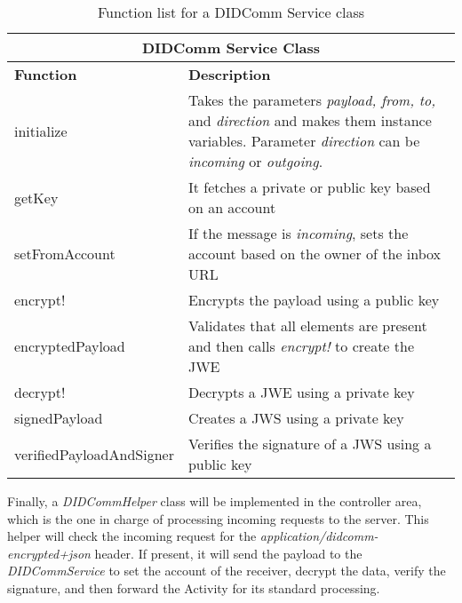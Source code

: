 \begin{table}[H]
  \centering
  \begin{tabular}{|p{5cm}|p{10cm}| }
    \hline
    \multicolumn{2}{|c|}{DIDComm Service Class} \\
    \hline
    \textbf{Function} & \textbf{Description} \\
    \hline
    \hline
    initialize & Takes the parameters \emph{payload, from, to,} and \emph{direction} and makes them instance variables. Parameter \emph{direction} can be \emph{incoming} or \emph{outgoing}. \\
    \hline
    getKey & It fetches a private or public key based on an account\\
    \hline
    setFromAccount & If the message is \emph{incoming}, sets the account based on the owner of the inbox URL\\
    \hline
    encrypt! & Encrypts the payload using a public key\\
    \hline
    encryptedPayload & Validates that all elements are present and then calls \emph{encrypt!} to create the JWE\\
    \hline
    decrypt! & Decrypts a JWE using a private key\\ 
    \hline
    signedPayload & Creates a JWS using a private key\\ 
    \hline
    verifiedPayloadAndSigner & Verifies the signature of a JWS using a public key\\
    \hline
  \end{tabular}
  \caption{Function list for a DIDComm Service class}
  \label{table:didcomm_service}
\end{table}

Finally, a \emph{DIDCommHelper} class will be implemented in the controller area, which is the one in charge of processing incoming requests to the server. This helper will check the incoming request for the \emph{application/didcomm-encrypted+json} header. If present, it will send the payload to the \emph{DIDCommService} to set the account of the receiver, decrypt the data, verify the signature, and then forward the Activity for its standard processing. 


